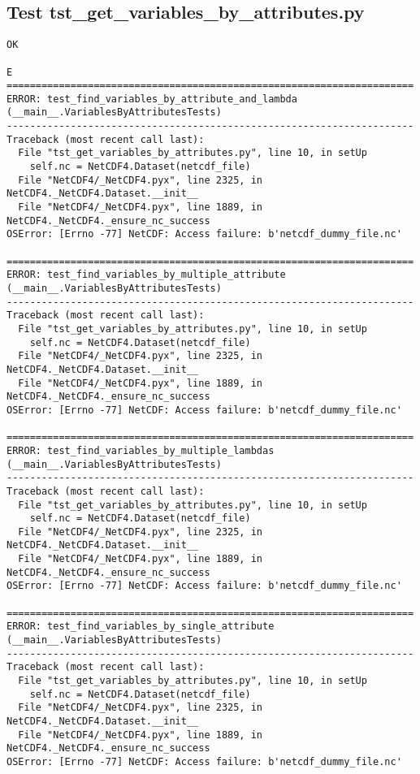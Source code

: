\subsection{Test tst\_get\_variables\_by\_attributes.py}

\begin{verbatim}
OK

E
======================================================================
ERROR: test_find_variables_by_attribute_and_lambda (__main__.VariablesByAttributesTests)
----------------------------------------------------------------------
Traceback (most recent call last):
  File "tst_get_variables_by_attributes.py", line 10, in setUp
    self.nc = NetCDF4.Dataset(netcdf_file)
  File "NetCDF4/_NetCDF4.pyx", line 2325, in NetCDF4._NetCDF4.Dataset.__init__
  File "NetCDF4/_NetCDF4.pyx", line 1889, in NetCDF4._NetCDF4._ensure_nc_success
OSError: [Errno -77] NetCDF: Access failure: b'netcdf_dummy_file.nc'

======================================================================
ERROR: test_find_variables_by_multiple_attribute (__main__.VariablesByAttributesTests)
----------------------------------------------------------------------
Traceback (most recent call last):
  File "tst_get_variables_by_attributes.py", line 10, in setUp
    self.nc = NetCDF4.Dataset(netcdf_file)
  File "NetCDF4/_NetCDF4.pyx", line 2325, in NetCDF4._NetCDF4.Dataset.__init__
  File "NetCDF4/_NetCDF4.pyx", line 1889, in NetCDF4._NetCDF4._ensure_nc_success
OSError: [Errno -77] NetCDF: Access failure: b'netcdf_dummy_file.nc'

======================================================================
ERROR: test_find_variables_by_multiple_lambdas (__main__.VariablesByAttributesTests)
----------------------------------------------------------------------
Traceback (most recent call last):
  File "tst_get_variables_by_attributes.py", line 10, in setUp
    self.nc = NetCDF4.Dataset(netcdf_file)
  File "NetCDF4/_NetCDF4.pyx", line 2325, in NetCDF4._NetCDF4.Dataset.__init__
  File "NetCDF4/_NetCDF4.pyx", line 1889, in NetCDF4._NetCDF4._ensure_nc_success
OSError: [Errno -77] NetCDF: Access failure: b'netcdf_dummy_file.nc'

======================================================================
ERROR: test_find_variables_by_single_attribute (__main__.VariablesByAttributesTests)
----------------------------------------------------------------------
Traceback (most recent call last):
  File "tst_get_variables_by_attributes.py", line 10, in setUp
    self.nc = NetCDF4.Dataset(netcdf_file)
  File "NetCDF4/_NetCDF4.pyx", line 2325, in NetCDF4._NetCDF4.Dataset.__init__
  File "NetCDF4/_NetCDF4.pyx", line 1889, in NetCDF4._NetCDF4._ensure_nc_success
OSError: [Errno -77] NetCDF: Access failure: b'netcdf_dummy_file.nc'


\end{verbatim}
